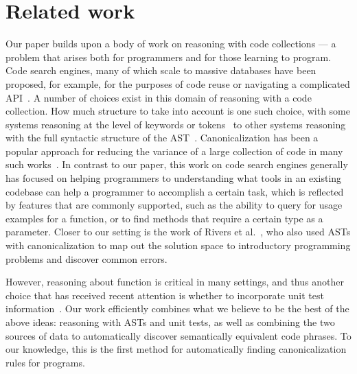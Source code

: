 \section{Related work}\label{sec:relatedwork}
Our paper builds upon a body of work on reasoning with code collections --- a problem that arises
both for programmers and for those learning to program.  
Code search engines, many of which scale to massive databases 
have been proposed, for example, for the purposes of code reuse or navigating a complicated API~\cite{sindhgatta06,hoffmann07}.
A number of choices exist in this domain of reasoning with a code collection.
How much structure to take into account is one such choice, 
with some systems reasoning at the level of keywords or tokens~\cite{hummel08, hartmann10} to other systems reasoning
with the full syntactic 
structure of the AST~\cite{paul94, thummalapenta07,kim10}.
Canonicalization has been a popular approach for reducing the variance of a large collection of code  in many such works~\cite{baxter98,xu03}.
In contrast to our paper, this work on code search engines generally has focused on helping programmers to understanding what tools in an existing 
codebase can help a programmer to accomplish 
a certain task, which is reflected by features that are commonly supported, such as the ability to query for usage examples for a function, 
or to find methods that require a certain type as a parameter.  
Closer to our setting is the work of Rivers et al.~\cite{rivers12,rivers13}, who also used ASTs with canonicalization to map out the solution space to 
introductory programming problems and discover common errors.

However, reasoning about function is critical in many settings, and thus
another choice that has received recent attention is whether to incorporate 
unit test information~\cite{hummel08,lazzarini09}.  
Our work efficiently combines what we believe to be the best of the above ideas: reasoning with ASTs and unit tests, as well as combining the
two sources of data to automatically discover semantically equivalent code phrases.  To our knowledge, this is
the first method for automatically finding canonicalization rules for programs.


